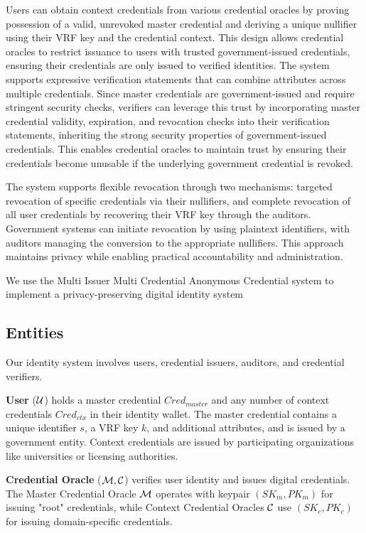 \noindent Users can obtain context credentials from various credential oracles by proving possession of a valid, unrevoked master credential and deriving a unique nullifier using their VRF key and the credential context. This design allows credential oracles to restrict issuance to users with trusted government-issued credentials, ensuring their credentials are only issued to verified identities. The system supports expressive verification statements that can combine attributes across multiple credentials. Since master credentials are government-issued and require stringent security checks, verifiers can leverage this trust by incorporating master credential validity, expiration, and revocation checks into their verification statements, inheriting the strong security properties of government-issued credentials. This enables credential oracles to maintain trust by ensuring their credentials become unusable if the underlying government credential is revoked.


\noindent The system supports flexible revocation through two mechanisms: targeted revocation of specific credentials via their nullifiers, and complete revocation of all user credentials by recovering their VRF key through the auditors. Government systems can initiate revocation by using plaintext identifiers, with auditors managing the conversion to the appropriate nullifiers. This approach maintains privacy while enabling practical accountability and administration.

We use the Multi Issuer Multi Credential Anonymous Credential system to implement a privacy-preserving digital identity system

\subsection{Entities}
Our identity system involves users, credential issuers, auditors, and credential verifiers.

\noindent \textbf{User} ($\mathcal{U}$) holds a master credential $Cred_{master}$ and any number of context credentials $Cred_{ctx}$ in their identity wallet. The master credential contains a unique identifier $s$, a VRF key $k$, and additional attributes, and is issued by a government entity. Context credentials are issued by participating organizations like universities or licensing authorities.

\noindent \textbf{Credential Oracle} ($\mathcal{M}, \mathcal{C}$) verifies user identity and issues digital credentials. The Master Credential Oracle $\mathcal{M}$ operates with keypair $(SK_{m}, PK_{m})$ for issuing "root" credentials, while Context Credential Oracles $\mathcal{C}$ use $(SK_{c}, PK_{c})$ for issuing domain-specific credentials.

